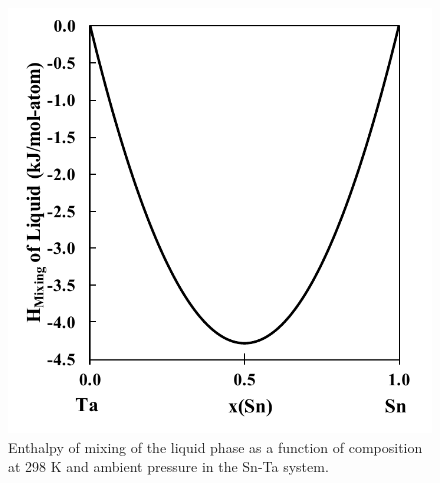 \pagebreak
\begin{figure}[H]
	\centering
	\includegraphics{Chapter-4/Figures/HofMix.pdf}
	\caption{Enthalpy of mixing of the liquid phase as a function of composition at 298 K and ambient pressure in the Sn-Ta system.}
	\label{Ch4-figure:HofMix}
\end{figure}
